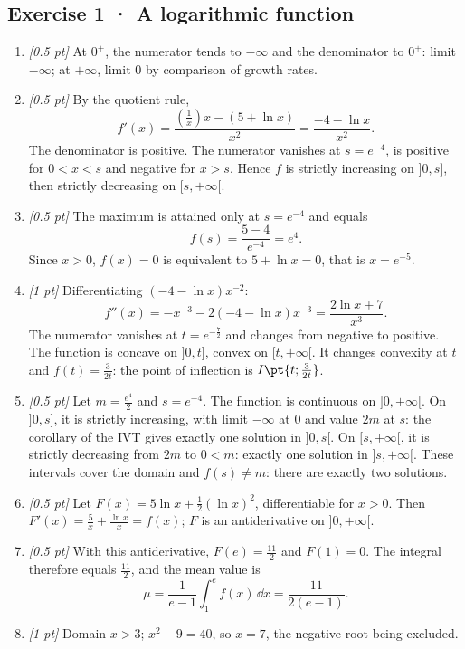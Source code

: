 \subsection*{Exercise 1 · A logarithmic function}\begin{enumerate}

\item \textit{[0.5 pt]} At $0^+$, the numerator tends to $-\infty$ and the denominator to $0^+$: limit $-\infty$; at $+\infty$, limit $0$ by comparison of growth rates.

\item \textit{[0.5 pt]} By the quotient rule,
\[f'(x)=\frac{(\frac{1}{x})x-(5+\ln x)}{x^2}=\frac{-4-\ln x}{x^2}.\]
The denominator is positive. The numerator vanishes at $s=e^{-4}$, is positive for $0<x<s$ and negative for $x>s$. Hence $f$ is strictly increasing on $]0,s]$, then strictly decreasing on $[s,+\infty[$.

\item \textit{[0.5 pt]} The maximum is attained only at $s=e^{-4}$ and equals
\[f(s)=\frac{5- 4}{e^{-4}}=e^{4}.\]
Since $x>0$, $f(x)=0$ is equivalent to $5+\ln x=0$, that is $x=e^{-5}$.

\item \textit{[1 pt]} Differentiating $(-4-\ln x)x^{-2}$:
\[f''(x)=-x^{-3}-2(-4-\ln x)x^{-3}=\frac{2\ln x+7}{x^3}.\]
The numerator vanishes at $t=e^{-\frac{7}{2}}$ and changes from negative to positive. The function is concave on $]0,t]$, convex on $[t,+\infty[$. It changes convexity at $t$ and $f(t)=\frac{3}{2t}$: the point of inflection is $I\pt{t;\frac{3}{2t}}$.

\item \textit{[0.5 pt]} Let $m=\frac{e^{4}}{2}$ and $s=e^{-4}$. The function is continuous on $]0,+\infty[$. On $]0,s]$, it is strictly increasing, with limit $-\infty$ at $0$ and value $2m$ at $s$: the corollary of the IVT gives exactly one solution in $]0,s[$. On $[s,+\infty[$, it is strictly decreasing from $2m$ to $0<m$: exactly one solution in $]s,+\infty[$. These intervals cover the domain and $f(s)\ne m$: there are exactly two solutions.

\item \textit{[0.5 pt]} Let $F(x)=5\ln x+\frac12(\ln x)^2$, differentiable for $x>0$. Then $F'(x)=\frac{5}{x}+\frac{\ln x}{x}=f(x)$; $F$ is an antiderivative on $]0,+\infty[$.

\item \textit{[0.5 pt]} With this antiderivative, $F(e)=\frac{11}{2}$ and $F(1)=0$. The integral therefore equals $\frac{11}{2}$, and the mean value is
\[\mu=\frac{1}{e-1}\int_1^e f(x)\,\dd x=\frac{11}{2(e-1)}.\]

\item \textit{[1 pt]} Domain $x>3$; $x^2-9=40$, so $x=7$, the negative root being excluded.

\end{enumerate}

